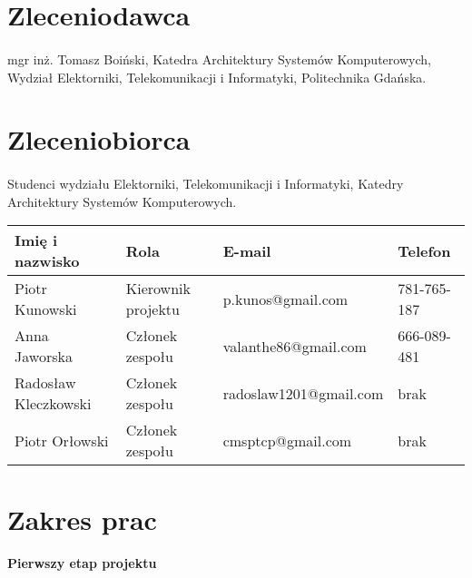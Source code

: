 \documentclass[a4paper,10pt]{article}
\begin{document}
\section{Zleceniodawca}
\paragraph{} mgr inż. Tomasz Boiński, Katedra Architektury Systemów Komputerowych, Wydział Elektorniki, Telekomunikacji i Informatyki, Politechnika Gdańska.


\section{Zleceniobiorca}
\paragraph{} Studenci wydziału Elektorniki, Telekomunikacji i Informatyki, Katedry Architektury Systemów Komputerowych.
\begin{center}
\begin{tabular}{|l|l|l|l|}
\hline
\textbf{Imię i nazwisko} & \textbf{Rola} & \textbf{E-mail} & \textbf{Telefon} \tabularnewline \hline
Piotr Kunowski & Kierownik projektu & p.kunos@gmail.com & 781-765-187 \tabularnewline \hline 
Anna Jaworska & Członek zespołu & valanthe86@gmail.com & 666-089-481 \tabularnewline \hline
Radosław Kleczkowski & Członek zespołu & radoslaw1201@gmail.com & brak \tabularnewline \hline
Piotr Orłowski & Członek zespołu & cmsptcp@gmail.com & brak \tabularnewline \hline
\end{tabular}
\end{center}

\section{Zakres prac}

\paragraph{} \textbf{Pierwszy etap projektu}
\end{document}
